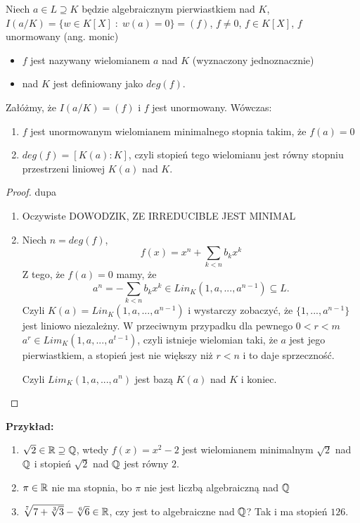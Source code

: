 \begin{definition}
Niech $a\in L\supseteq K$ będzie algebraicznym pierwiastkiem nad $K$, $I(a/K)=\{w\in K[X]\;:\;w(a)=0\}=(f)$, $f\neq 0$, $f\in K[X]$, $f$ unormowany (ang. monic)
\begin{itemize}
    \item $f$ jest nazywany wielomianem  $a$ nad $K$ (wyznaczony jednoznacznie)
    \item {} nad $K$ jest definiowany jako $deg(f)$.
\end{itemize}
\end{definition}


\begin{remark}[$I(a/K)=(f)\implies deg(f)=\begin{bmatrix}K(a):K\end{bmatrix}$]
    Załóżmy, że $I(a/K)=(f)$ i $f$ jest unormowany. Wówczas:
    \begin{enumerate}
    \item $f$ jest unormowanym wielomianem minimalnego stopnia takim, że $f(a)=0$

    \item $deg(f)=[K(a):K]$, czyli stopień tego wielomianu jest równy stopniu przestrzeni liniowej $K(a)$ nad $K$.
    \end{enumerate}
\end{remark}

\begin{proof}{\color{pagColor}dupa}

\begin{enumerate}
\item Oczywiste {\large\color{orange}DOWODZIK, ZE IRREDUCIBLE JEST MINIMAL}

\item Niech $n=deg(f)$, 
$$f(x)=x^n+\sum\limits_{k<n}b_kx^k$$
Z tego, że $f(a)=0$ mamy, że 
$$a^n=-\sum\limits_{k<n}b_kx^k\in Lin_K(1,a,...,a^{n-1})\subseteq L.$$
Czyli $K(a)=Lin_K(1,a,...,a^{n-1})$ i wystarczy zobaczyć, że $\{1,..., a^{n-1}\}$ jest liniowo niezależny. W przeciwnym przypadku dla pewnego $0<r<m$ $a^r\in Lim_K(1,a,...,a^{t-1})$, czyli istnieje wielomian taki, że $a$ jest jego pierwiastkiem, a stopień jest nie większy niż $r<n$ i to daje sprzeczność.

Czyli $Lim_K(1,a,...,a^n)$ jest bazą $K(a)$ nad $K$ i koniec.
\end{enumerate}
\end{proof}
\textbf{Przykład:}
\begin{enumerate}
    \item $\sqrt{2}\in\mathbb{R}\supseteq\mathbb{Q}$, wtedy $f(x)=x^2-2$ jest wielomianem minimalnym $\sqrt2$ nad $\mathbb{Q}$ i stopień $\sqrt{2}$ nad $\mathbb{Q}$ jest równy $2$.
    \item $\pi\in\mathbb{R}$ nie ma stopnia, bo $\pi$ nie jest liczbą algebraiczną nad $\mathbb{Q}$
    \item  $\sqrt[7]{7+\sqrt[3]{3}}-\sqrt[6]{6}\in\mathbb{R}$, czy jest to algebraiczne nad $\mathbb{Q}$? Tak i ma stopień $126$.
\end{enumerate}

